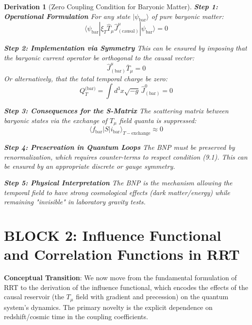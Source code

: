 \documentclass[10pt, a4paper]{article}
\newcommand{\xiT}{\xi_T}       %
\newtheorem{derivation}{Derivation}
\begin{document}
\begin{derivation}[Zero Coupling Condition for Baryonic Matter]
\textbf{Step 1: Operational Formulation}
For any state $|\psi_{\text{bar}}\rangle$ of pure baryonic matter:
\begin{equation}
\langle \psi_{\text{bar}} | \xiT \hat{T}_\mu \hat{J}^\mu_{(\text{causal})} | \psi_{\text{bar}} \rangle = 0
\tag{9.1}
\end{equation}

\textbf{Step 2: Implementation via Symmetry}
This can be ensured by imposing that the baryonic current operator be orthogonal to the causal vector:
\begin{equation}
\hat{J}^\mu_{(\text{bar})} \bar{T}_\mu = 0
\tag{9.2}
\end{equation}
Or alternatively, that the total temporal charge be zero:
\begin{equation}
Q_T^{\text{(bar)}} = \int d^3x \sqrt{-g} \, \hat{J}^0_{(\text{bar})} = 0
\tag{9.3}
\end{equation}

\textbf{Step 3: Consequences for the S-Matrix}
The scattering matrix between baryonic states via the exchange of $T_\mu$ field quanta is suppressed:
\begin{equation}
\langle f_{\text{bar}} | S | i_{\text{bar}} \rangle_{T-\text{exchange}} \approx 0
\tag{9.4}
\end{equation}

\textbf{Step 4: Preservation in Quantum Loops}
The BNP must be preserved by renormalization, which requires counter-terms to respect condition (9.1). This can be ensured by an appropriate discrete or gauge symmetry.

\textbf{Step 5: Physical Interpretation}
The BNP is the mechanism allowing the temporal field to have strong cosmological effects (dark matter/energy) while remaining "invisible" in laboratory gravity tests.
\end{derivation}


\section*{BLOCK 2: Influence Functional and Correlation Functions in RRT}

\textbf{Conceptual Transition}: We now move from the fundamental formulation of RRT to the derivation of the influence functional, which encodes the effects of the causal reservoir (the $T_\mu$ field with gradient and precession) on the quantum system's dynamics. The primary novelty is the explicit dependence on redshift/cosmic time in the coupling coefficients.
\end{document}
